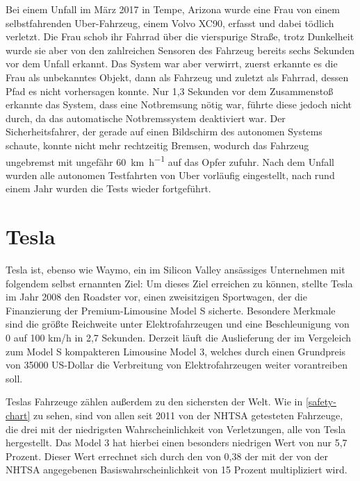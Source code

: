 Bei einem Unfall im März 2017 in Tempe, Arizona wurde eine Frau von einem selbstfahrenden Uber-Fahrzeug, einem Volvo XC90, erfasst und dabei tödlich verletzt. Die Frau schob ihr Fahrrad über die vierspurige Straße, trotz Dunkelheit wurde sie aber von den zahlreichen Sensoren des Fahrzeug bereits sechs Sekunden vor dem Unfall erkannt. Das System war aber verwirrt, zuerst erkannte es die Frau als unbekanntes Objekt, dann als Fahrzeug und zuletzt als Fahrrad, dessen Pfad es nicht vorhersagen konnte. Nur 1,3 Sekunden vor dem Zusammenstoß erkannte das System, dass eine Notbremsung nötig war, führte diese jedoch nicht durch, da das automatische Notbremssystem deaktiviert war. Der Sicherheitsfahrer, der gerade auf einen Bildschirm des autonomen Systems schaute, konnte nicht mehr rechtzeitig Bremsen, wodurch das Fahrzeug ungebremst mit ungefähr \SI[per-mode=symbol]{60}{\kilo\metre\per\hour} auf das Opfer zufuhr. Nach dem Unfall wurden alle autonomen Testfahrten von Uber vorläufig eingestellt, nach rund einem Jahr wurden die Tests wieder fortgeführt.


\section{Tesla}

Tesla ist, ebenso wie Waymo, ein im Silicon Valley ansässiges Unternehmen mit folgendem selbst ernannten Ziel:  Um dieses Ziel erreichen zu können, stellte Tesla im Jahr 2008 den Roadster vor, einen zweisitzigen Sportwagen, der die Finanzierung der Premium-Limousine Model S sicherte. Besondere Merkmale sind die größte Reichweite unter Elektrofahrzeugen und eine Beschleunigung von 0 auf 100 \si[per-mode=symbol]{\kilo\metre\per\hour} in 2,7 Sekunden. Derzeit läuft die Auslieferung der im Vergeleich zum Model S kompakteren Limousine Model 3, welches durch einen Grundpreis von \num{35000} US-Dollar die Verbreitung von Elektrofahrzeugen weiter vorantreiben soll.

Teslas Fahrzeuge zählen außerdem zu den sichersten der Welt. Wie in \ref{safety-chart} zu sehen, sind von allen seit 2011 von der \ac{NHTSA} getesteten Fahrzeuge, die drei mit der niedrigsten Wahrscheinlichkeit von Verletzungen, alle von Tesla hergestellt. Das Model 3 hat hierbei einen besonders niedrigen Wert von nur 5,7 Prozent. Dieser Wert errechnet sich durch den  von 0,38 der mit der von der \ac{NHTSA} angegebenen Basiswahrscheinlichkeit von 15 Prozent multipliziert wird. 

